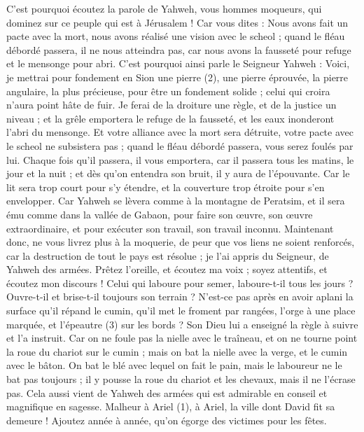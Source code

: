 \begin{multicols}{2}
{C'est pourquoi écoutez la parole de Yahweh, vous hommes moqueurs, qui dominez sur ce peuple qui est à Jérusalem !
Car vous dites : Nous avons fait un pacte avec la mort, nous avons réalisé une vision avec le scheol ; quand le fléau débordé passera, il ne nous atteindra pas, car nous avons la fausseté pour refuge et le mensonge pour abri.
C'est pourquoi ainsi parle le Seigneur Yahweh : Voici, je mettrai pour fondement en Sion une pierre (2), une pierre éprouvée, la pierre angulaire, la plus précieuse, pour être un fondement solide ; celui qui croira n’aura point hâte de fuir.
Je ferai de la droiture une règle, et de la justice un niveau ; et la grêle emportera le refuge de la fausseté, et les eaux inonderont l’abri du mensonge.
Et votre alliance avec la mort sera détruite, votre pacte avec le scheol ne subsistera pas ; quand le fléau débordé passera, vous serez foulés par lui.
Chaque fois qu'il passera, il vous emportera, car il passera tous les matins, le jour et la nuit ; et dès qu'on entendra son bruit, il y aura de l’épouvante.
Car le lit sera trop court pour s'y étendre, et la couverture trop étroite pour s’en envelopper.
Car Yahweh se lèvera comme à la montagne de Peratsim, et il sera ému comme dans la vallée de Gabaon, pour faire son œuvre, son œuvre extraordinaire, et pour exécuter son travail, son travail inconnu.
Maintenant donc, ne vous livrez plus à la moquerie, de peur que vos liens ne soient renforcés, car la destruction de tout le pays est résolue ; je l’ai appris du Seigneur, de Yahweh des armées.
Prêtez l'oreille, et écoutez ma voix ; soyez attentifs, et écoutez mon discours !
Celui qui laboure pour semer, laboure-t-il tous les jours ? Ouvre-t-il et brise-t-il toujours son terrain ?
N’est-ce pas après en avoir aplani la surface qu’il répand le cumin, qu’il met le froment par rangées, l’orge à une place marquée, et l’épeautre (3) sur les bords ?
Son Dieu lui a enseigné la règle à suivre et l’a instruit.
Car on ne foule pas la nielle avec le traîneau, et on ne tourne point la roue du chariot sur le cumin ; mais on bat la nielle avec la verge, et le cumin avec le bâton.
On bat le blé avec lequel on fait le pain, mais le laboureur ne le bat pas toujours ; il y pousse la roue du chariot et les chevaux, mais il ne l’écrase pas.
Cela aussi vient de Yahweh des armées qui est admirable en conseil et magnifique en sagesse.
\VerseOne{}Malheur à Ariel (1), à Ariel, la ville dont David fit sa demeure ! Ajoutez année à année, qu'on égorge des victimes pour les fêtes.
}
\end{multicols}
